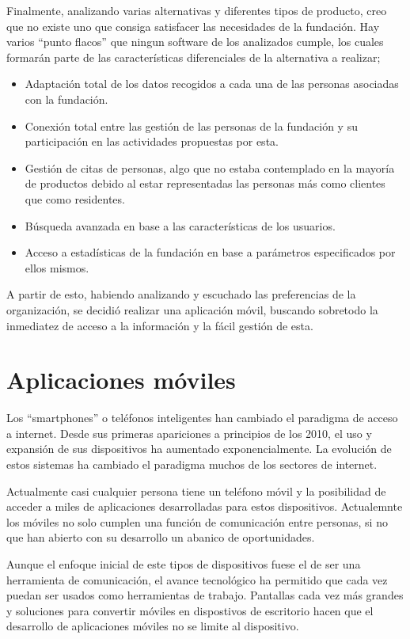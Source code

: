 Finalmente, analizando varias alternativas y diferentes tipos de producto, creo que no existe uno que consiga satisfacer las necesidades de la fundación. Hay varios ``punto flacos'' que ningun software de los analizados cumple, los cuales formarán parte de las características diferenciales de la alternativa a realizar;

\begin{itemize}
    \item Adaptación total de los datos recogidos a cada una de las personas asociadas con la fundación.
    \item Conexión total entre las gestión de las personas de la fundación y su participación en las actividades propuestas por esta.
    \item Gestión de citas de personas, algo que no estaba contemplado en la mayoría de productos debido al estar representadas las personas más como clientes que como residentes.
    \item Búsqueda avanzada en base a las características de los usuarios.
    \item Acceso a estadísticas de la fundación en base a parámetros especificados por ellos mismos.
\end{itemize}

A partir de esto, habiendo analizando y escuchado las preferencias de la organización, se decidió realizar una aplicación móvil, buscando sobretodo la inmediatez de acceso a la información y la fácil gestión de esta.     

\section{Aplicaciones móviles}

Los ``smartphones'' o teléfonos inteligentes han cambiado el paradigma de acceso a internet. Desde sus primeras apariciones a principios de los 2010, el uso y expansión de sus dispositivos ha aumentado exponencialmente. La evolución de estos sistemas ha cambiado el paradigma muchos de los sectores de internet. 

Actualmente casi cualquier persona tiene un teléfono móvil y la posibilidad de acceder a miles de aplicaciones desarrolladas para estos dispositivos. Actualemnte los móviles no solo cumplen una función de comunicación entre personas, si no que han abierto con su desarrollo un abanico de oportunidades.

Aunque el enfoque inicial de este tipos de dispositivos fuese el de ser una herramienta de comunicación, el avance tecnológico ha permitido que cada vez puedan ser usados como herramientas de trabajo. Pantallas cada vez más grandes y soluciones para convertir móviles en dispostivos de escritorio hacen que el desarrollo de aplicaciones móviles no se limite al dispositivo. 

